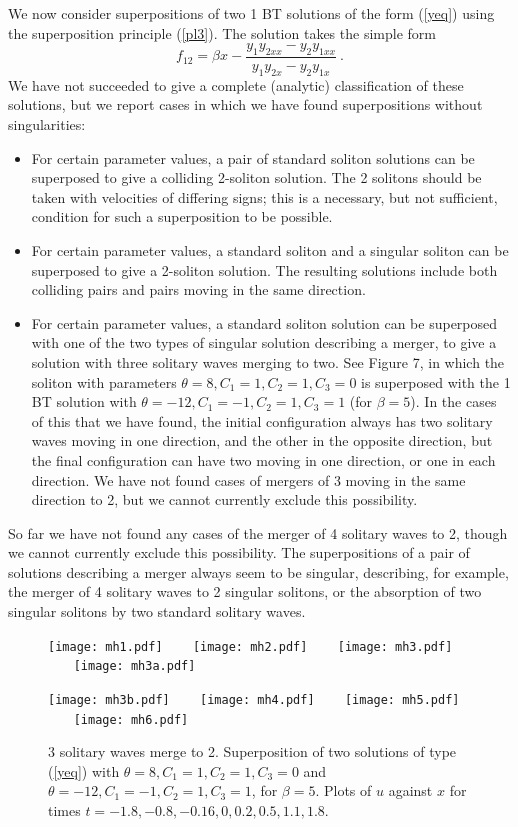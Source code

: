 \documentclass[12pt]{article}
\begin{document}
We now consider superpositions of two 1 BT solutions of the form (\ref{yeq})
using the superposition principle (\ref{pl3}). The solution takes the simple form
\begin{equation}
  f_{12} = \beta x - \frac{y_1 y_{2xx} - y_2 y_{1xx}}{y_1 y_{2x} - y_2 y_{1x}}\ .  \label{2bt}
\end{equation}
We have not succeeded to give a complete (analytic) classification of these solutions, but
we report cases in which we have found superpositions without singularities: 
\begin{itemize}
\item  For certain parameter values, a pair of standard soliton solutions can be superposed to give a
  colliding 2-soliton solution.  The 2 solitons should be taken with velocities of differing signs;
  this is a necessary, but not sufficient, condition for such a superposition to be possible. 
\item  For certain parameter values, a standard soliton and a singular soliton can be superposed to give
  a 2-soliton solution. The resulting solutions include both colliding pairs and pairs moving in the
  same direction. 
\item  For certain parameter values, a standard soliton solution can be superposed with one of the two
  types of singular solution describing a merger, to give a solution with three solitary waves merging to two.
  See Figure 7, in which the soliton with parameters $\theta=8,C_1=1,C_2=1,C_3=0$ is superposed with
  the 1 BT solution with $\theta=-12,C_1=-1,C_2=1,C_3=1$ (for $\beta=5$). In the cases of this that we have
  found, the initial configuration always has two solitary waves moving in one direction, and the other in the
  opposite direction, but the final configuration can have two moving in one direction, or one in each
  direction. We have not found cases of mergers of 3 moving in the same direction to 2, but we cannot
  currently exclude this possibility. 
\end{itemize}
So far we have not found any cases of the merger of 4 solitary waves to 2, though we cannot currently
exclude this possibility. The superpositions of a pair of solutions describing a merger always seem to be
singular, describing, for example, the merger of 4 solitary waves to 2 singular solitons, or the absorption of
two singular solitons by two standard solitary waves. 

\begin{figure}
      \centerline{
        \texttt{[image: mh1.pdf]} ~~~
        \texttt{[image: mh2.pdf]} ~~~
        \texttt{[image: mh3.pdf]} ~~~
        \texttt{[image: mh3a.pdf]} 
        }
      \centerline{
        \texttt{[image: mh3b.pdf]} ~~~
        \texttt{[image: mh4.pdf]} ~~~
        \texttt{[image: mh5.pdf]} ~~~
        \texttt{[image: mh6.pdf]} 
        }
      \caption{3 solitary waves merge to 2. Superposition of two solutions of type (\ref{yeq}) with
        $\theta=8,C_1=1,C_2=1,C_3=0$ and  $\theta=-12,C_1=-1,C_2=1,C_3=1$, for $\beta=5$. Plots
        of $u$ against $x$ for times $t=-1.8,-0.8,-0.16,0,0.2,0.5,1.1,1.8$. 
      }
\end{figure}
\end{document}
